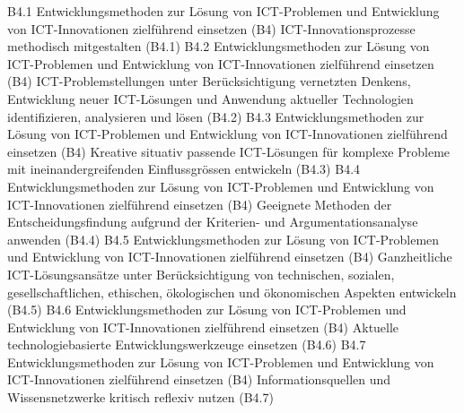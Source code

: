 \templateCard
  {B4.1}
  {Entwicklungsmethoden zur Lösung von ICT-Problemen und Entwicklung von ICT-Innovationen zielführend einsetzen (B4)}
  {ICT-Innovationsprozesse methodisch mitgestalten (B4.1)}
\templateCard
  {B4.2}
  {Entwicklungsmethoden zur Lösung von ICT-Problemen und Entwicklung von ICT-Innovationen zielführend einsetzen (B4)}
  {ICT-Problemstellungen unter Berücksichtigung vernetzten Denkens, Entwicklung neuer ICT-Lösungen und Anwendung aktueller Technologien identifizieren, analysieren und lösen (B4.2)}
\templateCard
  {B4.3}
  {Entwicklungsmethoden zur Lösung von ICT-Problemen und Entwicklung von ICT-Innovationen zielführend einsetzen (B4)}
  {Kreative situativ passende ICT-Lösungen für komplexe Probleme mit ineinandergreifenden Einflussgrössen entwickeln (B4.3)}
\templateCard
  {B4.4}
  {Entwicklungsmethoden zur Lösung von ICT-Problemen und Entwicklung von ICT-Innovationen zielführend einsetzen (B4)}
  {Geeignete Methoden der Entscheidungsfindung aufgrund der Kriterien- und Argumentationsanalyse anwenden (B4.4)}
\templateCard
  {B4.5}
  {Entwicklungsmethoden zur Lösung von ICT-Problemen und Entwicklung von ICT-Innovationen zielführend einsetzen (B4)}
  {Ganzheitliche ICT-Lösungsansätze unter Berücksichtigung von technischen, sozialen, gesellschaftlichen, ethischen, ökologischen und ökonomischen Aspekten entwickeln (B4.5)}
\templateCard
  {B4.6}
  {Entwicklungsmethoden zur Lösung von ICT-Problemen und Entwicklung von ICT-Innovationen zielführend einsetzen (B4)}
  {Aktuelle technologiebasierte Entwicklungswerkzeuge einsetzen (B4.6)}
\templateCard
  {B4.7}
  {Entwicklungsmethoden zur Lösung von ICT-Problemen und Entwicklung von ICT-Innovationen zielführend einsetzen (B4)}
  {Informationsquellen und Wissensnetzwerke kritisch reflexiv nutzen (B4.7)}

